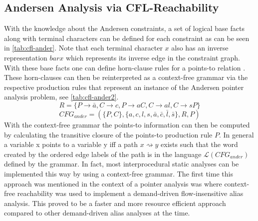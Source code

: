 \subsection{Andersen Analysis via CFL-Reachability}\label{sec:ander-cfl}
With the knowledge about the Andersen constraints, a set of logical base facts along with terminal characters can be defined for each constraint as can be seen in \autoref{tab:cfl-ander}. Note that each terminal character $x$ also has an inverse representation $bar{x}$ which represents its inverse edge in the constraint graph.
With these base facts one can define horn-clause rules for a points-to relation \cite{reps1998program}. These horn-clauses can then be reinterpreted as a context-free grammar via the respective production rules that represent an instance of the Andersen pointer analysis problem, see \autoref{tab:cfl-ander2}.
$$R=\{P\rightarrow \bar{a}, C \rightarrow c, P\rightarrow aC, C\rightarrow al, C\rightarrow sP\}$$
$$CFG_{ander}=(\{P,C\}, \{a,c,l,s,\bar{a},\bar{c},\bar{l},\bar{s}\}, R, P)$$
With the context-free grammar the points-to information can then be computed by calculating the transitive closure of the points-to production rule $P$. In general a variable x points to a variable y iff a path $x \rightsquigarrow y$ exists such that the word created by the ordered edge labels of the path is in the language $\mathcal{L}(CFG_{ander})$ defined by the grammar.
In fact, most interprocedural static analyses can be implemented this way by using a context-free grammar.
The first time this approach was mentioned in the context of a pointer analysis was \cite{zheng2008demand} where context-free reachability was used to implement a demand-driven flow-insensitive alias analysis.
This proved to be a faster and more resource efficient approach compared to other demand-driven alias analyses at the time.
